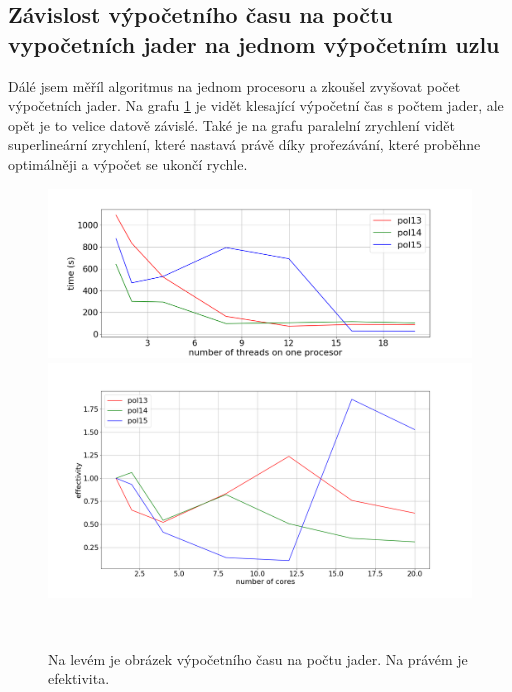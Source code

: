 \documentclass[]{article}
\begin{document}
\subsection{Závislost výpočetního času na počtu vypočetních jader na jednom výpočetním uzlu}

Dálé jsem měříl algoritmus na jednom procesoru a zkoušel zvyšovat počet výpočetních jader. Na grafu \ref{a:dpp} je vidět klesající výpočetní čas s počtem jader, ale opět je to velice datově závislé. Také je na grafu paralelní zrychlení vidět superlineární zrychlení, které nastavá právě díky prořezávání, které proběhne optimálněji a výpočet se ukončí rychle.
 
 	\begin{figure}[H]
	\centering
    \begin{minipage}[c]{0.49\textwidth}
        \centering\includegraphics[width=\textwidth]{img/nTdp} 
    \end{minipage}
    \begin{minipage}[c]{0.49\textwidth}
        \centering \includegraphics[width=\textwidth]{img/parralelEfectivitydp} 
    \end{minipage}
    \\
   \caption{Na levém je obrázek výpočetního času na počtu jader. Na právém je efektivita.}\label{a:dpp}
    \end{figure}
    
\end{document}
